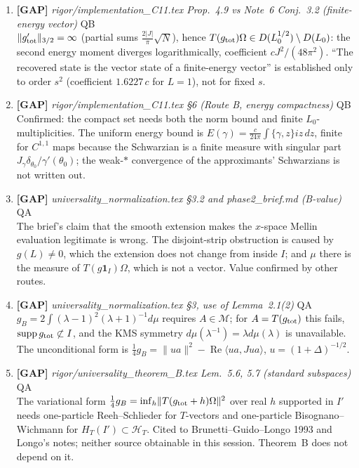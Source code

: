 \documentclass[11pt]{article}
\begin{document}
\begin{enumerate}[leftmargin=1.6em,itemsep=6pt]
\item \textbf{[GAP]} \emph{rigor/implementation\_C11.tex Prop.~4.9 vs Note~6 Conj.~3.2 (finite-energy vector)} \hfill\textsc{QB}\\ \(\lVert g_{\rm tot}'\rVert_{3/2}=\infty\) (partial sums \(\tfrac{2|J|}{\pi}\sqrt N\)), hence \(T(g_{\rm tot})\Omega\in D(L_0^{1/2})\setminus D(L_0)\): the second energy moment diverges logarithmically, coefficient \(cJ^2/(48\pi^2)\). ``The recovered state is the vector state of a finite-energy vector'' is established only to order \(s^2\) (coefficient \(1.6227\,c\) for \(L=1\)), not for fixed \(s\).
\item \textbf{[GAP]} \emph{rigor/implementation\_C11.tex \S6 (Route B, energy compactness)} \hfill\textsc{QB}\\ Confirmed: the compact set needs both the norm bound and finite \(L_0\)-multiplicities. The uniform energy bound is \(E(\gamma)=\frac c{24\pi}\int\{\gamma,z\}iz\,dz\), finite for \(C^{1,1}\) maps because the Schwarzian is a finite measure with singular part \(J_\gamma\delta_{\theta_0}/\gamma'(\theta_0)\); the weak-\(*\) convergence of the approximants' Schwarzians is not written out.
\item \textbf{[GAP]} \emph{universality\_normalization.tex \S3.2 and phase2\_brief.md (B-value)} \hfill\textsc{QA}\\ The brief's claim that the smooth extension makes the \(x\)-space Mellin evaluation legitimate is wrong. The disjoint-strip obstruction is caused by \(g(L)\neq0\), which the extension does not change from inside \(I\); and \(\mu\) there is the measure of \(T(g\mathbf 1_I)\Omega\), which is not a vector. Value confirmed by other routes.
\item \textbf{[GAP]} \emph{universality\_normalization.tex \S3, use of Lemma~2.1(2)} \hfill\textsc{QA}\\ \(g_B=2\int(\lambda-1)^2(\lambda+1)^{-1}d\mu\) requires \(A\in\mathcal M\); for \(A=T(g_{\rm tot})\) this fails, \(\operatorname{supp}g_{\rm tot}\not\subset I\), and the KMS symmetry \(d\mu(\lambda^{-1})=\lambda d\mu(\lambda)\) is unavailable. The unconditional form is \(\frac14 g_B=\lVert ua\rVert^2-\operatorname{Re}\langle ua,Jua\rangle\), \(u=(1+\Delta)^{-1/2}\).
\item \textbf{[GAP]} \emph{rigor/universality\_theorem\_B.tex Lem.~5.6, 5.7 (standard subspaces)} \hfill\textsc{QA}\\ The variational form \(\frac14 g_B=\inf_h\lVert T(g_{\rm tot}+h)\Omega\rVert^2\) over real \(h\) supported in \(I'\) needs one-particle Reeh--Schlieder for \(T\)-vectors and one-particle Bisognano--Wichmann for \(H_T(I')\subset\mathcal H_T\). Cited to Brunetti--Guido--Longo 1993 and Longo's notes; neither source obtainable in this session. Theorem~B does not depend on it.

\end{enumerate}
\end{document}
